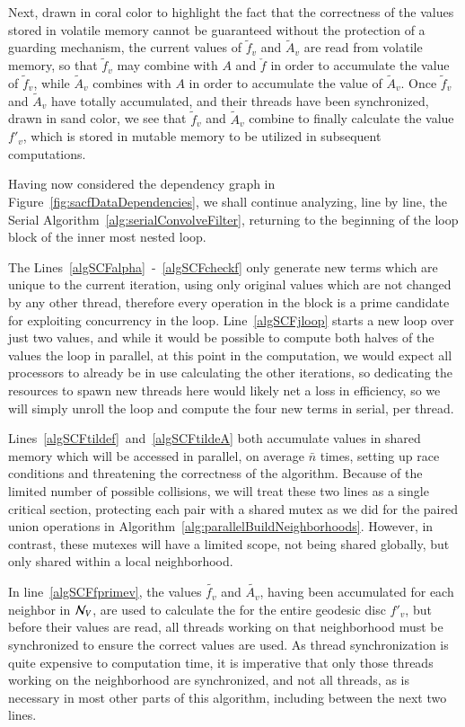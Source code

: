 Next, drawn in coral color to highlight the fact that the correctness of the values stored in volatile memory cannot be guaranteed without the protection of a guarding mechanism, the current values of $\tilde{f}_v$ and $\tilde{A}_v$ are read from volatile memory, so that $\tilde{f}_v$ may combine with $A$ and $\check{f}$ in order to accumulate the value of $\tilde{f}_v$, while $\tilde{A}_v$ combines with $A$ in order to accumulate the value of $\tilde{A}_v$. Once $\tilde{f}_v$ and $\tilde{A}_v$ have totally accumulated, and their threads have been synchronized, drawn in sand color, we see that $\tilde{f}_v$ and $\tilde{A}_v$ combine to finally calculate the value $f'_v$, which is stored in mutable memory to be utilized in subsequent computations.

Having now considered the dependency graph in Figure~\ref{fig:sacfDataDependencies}, we shall continue analyzing, line by line, the Serial Algorithm~\ref{alg:serialConvolveFilter}, returning to the beginning of the loop block of the inner most nested loop.

The Lines~\ref{algSCFalpha}~-~\ref{algSCFcheckf} only generate new terms which are unique to the current iteration, using only original values which are not changed by any other thread, therefore every operation in the block is a prime candidate for exploiting concurrency in the loop. Line~\ref{algSCFjloop} starts a new loop over just two values, and while it would be possible to compute both halves of the values the loop in parallel, at this point in the computation, we would expect all processors to already be in use calculating the other iterations, so dedicating the resources to spawn new threads here would likely net a loss in efficiency, so we will simply unroll the loop and compute the four new terms in serial, per thread.

Lines~\ref{algSCFtildef}~and~\ref{algSCFtildeA} both accumulate values in shared memory which will be accessed in parallel, on average $\bar{n}$ times, setting up race conditions and threatening the correctness of the algorithm. Because of the limited number of possible collisions, we will treat these two lines as a single critical section, protecting each pair with a shared mutex as we did for the paired union operations in Algorithm~\ref{alg:parallelBuildNeighborhoods}. However, in contrast, these mutexes will have a limited scope, not being shared globally, but only shared within a local neighborhood.

In line~\ref{algSCFfprimev}, the values $\tilde{f_v}$ and $\tilde{A_v}$, having been accumulated for each neighbor in $\mathcal{N}_V$, are used to calculate the \wmfv{} for the entire geodesic disc $f'_v$, but before their values are read, all threads working on that neighborhood must be synchronized to ensure the correct values are used. As thread synchronization is quite expensive to computation time, it is imperative that only those threads working on the neighborhood are synchronized, and not all threads, as is necessary in most other parts of this algorithm, including between the next two lines.

